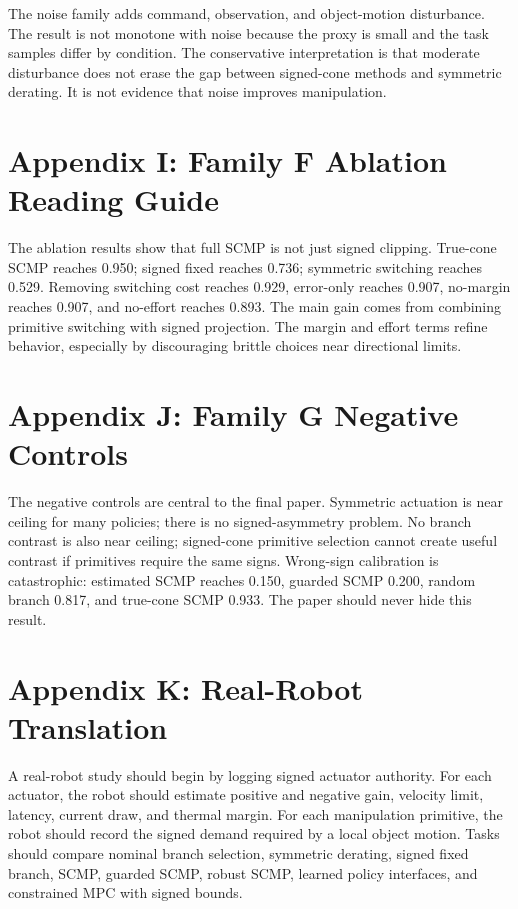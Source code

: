 \documentclass{article}
\begin{document}
The noise family adds command, observation, and object-motion disturbance. The result is not monotone with noise because the proxy is small and the task samples differ by condition. The conservative interpretation is that moderate disturbance does not erase the gap between signed-cone methods and symmetric derating. It is not evidence that noise improves manipulation.

\section{Appendix I: Family F Ablation Reading Guide}

The ablation results show that full SCMP is not just signed clipping. True-cone SCMP reaches 0.950; signed fixed reaches 0.736; symmetric switching reaches 0.529. Removing switching cost reaches 0.929, error-only reaches 0.907, no-margin reaches 0.907, and no-effort reaches 0.893. The main gain comes from combining primitive switching with signed projection. The margin and effort terms refine behavior, especially by discouraging brittle choices near directional limits.

\section{Appendix J: Family G Negative Controls}

The negative controls are central to the final paper. Symmetric actuation is near ceiling for many policies; there is no signed-asymmetry problem. No branch contrast is also near ceiling; signed-cone primitive selection cannot create useful contrast if primitives require the same signs. Wrong-sign calibration is catastrophic: estimated SCMP reaches 0.150, guarded SCMP 0.200, random branch 0.817, and true-cone SCMP 0.933. The paper should never hide this result.

\section{Appendix K: Real-Robot Translation}

A real-robot study should begin by logging signed actuator authority. For each actuator, the robot should estimate positive and negative gain, velocity limit, latency, current draw, and thermal margin. For each manipulation primitive, the robot should record the signed demand required by a local object motion. Tasks should compare nominal branch selection, symmetric derating, signed fixed branch, SCMP, guarded SCMP, robust SCMP, learned policy interfaces, and constrained MPC with signed bounds.
\end{document}
